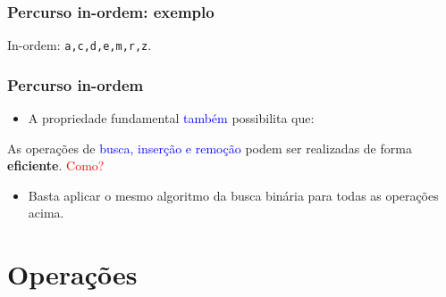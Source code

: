 \documentclass{beamer}
\newcommand{\tcb}[1]{\textcolor{blue}{#1}}
\newcommand{\tcr}[1]{\textcolor{red}{#1}}
\begin{document}
\begin{frame}
  \frametitle{Percurso in-ordem: exemplo}

    In-ordem: \texttt{a,c,d,e,m,r,z}.
    \vspace{1cm}

      \centering

\end{frame}

\begin{frame}[c]
  \frametitle{Percurso in-ordem}

  \begin{itemize}
    \item A propriedade fundamental \tcb{também} possibilita que:
  \end{itemize}

  \center As operações de \tcb{busca, inserção e remoção} podem ser realizadas de forma
          \textbf{eficiente}. \tcr{Como?}

  \pause

  \begin{itemize}
    \item Basta aplicar o mesmo algoritmo da busca binária para todas as operações acima.
  \end{itemize}

\end{frame}

\section{Operações}
\end{document}
